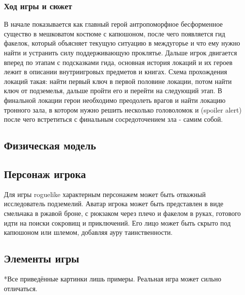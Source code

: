 \documentclass{article}
\begin{document}
\subsubsection{Ход игры и сюжет}
В начале показывается как главный герой антропоморфное бесформенное существо в мешковатом костюме с капюшоном, после чего появляется гид факелок, который объясняет текущую ситуацию в междугорье и что ему нужно найти и устранить силу поддерживающую проклятье. Дальше игрок двигается вперед по этапам с подсказками гида, основная история локаций и их героев лежит в описании внутриигровых предметов и книгах. Схема прохождения локаций такая: найти первый ключ в первой половине локации, потом найти ключ от подземелья, дальше пройти его и перейти на следующий этап. В финальной локации герои необходимо преодолеть врагов и найти локацию тронного зала, в котором нужно решить  несколько головоломок и (spoiler alert) после чего встретиться с финальным сосредоточением зла - самим собой.
\subsection{Физическая модель}
\subsection{Персонаж игрока}
Для игры roguelike характерным персонажем может быть отважный исследователь подземелий. Аватар игрока может быть представлен в виде смельчака в ржавой броне, с рюкзаком через плечо и факелом в руках, готового идти на поиски сокровищ и приключений. Его лицо может быть скрыто под капюшоном или шлемом, добавляя ауру таинственности.
\subsection{Элементы игры}
*Все приведённые картинки лишь примеры. Реальная игра может сильно отличаться.
\end{document}
